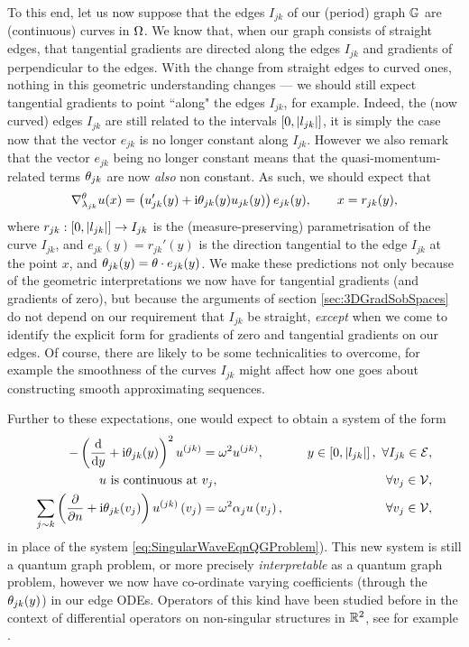 To this end, let us now suppose that the edges $I_{jk}$ of our (period) graph $\mathbb{G}$ are (continuous) curves in $\Omega$.
We know that, when our graph consists of straight edges, that tangential gradients are directed along the edges $I_{jk}$ and gradients of perpendicular to the edges.
With the change from straight edges to curved ones, nothing in this geometric understanding changes --- we should still expect tangential gradients to point ``along" the edges $I_{jk}$, for example.
Indeed, the (now curved) edges $I_{jk}$ are still related to the intervals $\left[ 0,\left\lvert l_{jk} \right\rvert \right]$, it is simply the case now that the vector $e_{jk}$ is no longer constant along $I_{jk}$.
However we also remark that the vector $e_{jk}$ being no longer constant means that the quasi-momentum-related terms $\theta_{jk}$ are now \emph{also} non constant.
As such, we should expect that
\begin{align*}
	\nabla^{\theta}_{\lambda_{jk}}u(x) = \left(  u_{jk}'(y) + \mathrm{i}\theta_{jk}(y) u_{jk}(y) \right)e_{jk}(y),
	\qquad x = r_{jk}(y),
\end{align*}
where $r_{jk}:\left[ 0,\left\lvert l_{jk} \right\rvert \right]\rightarrow I_{jk}$ is the (measure-preserving) parametrisation of the curve $I_{jk}$, and $e_{jk}(y) = r_{jk}'(y)$ is the direction tangential to the edge $I_{jk}$ at the point $x$, and $\theta_{jk}(y)=\theta\cdot e_{jk}(y)$.
We make these predictions not only because of the geometric interpretations we now have for tangential gradients (and gradients of zero), but because the arguments of section \ref{sec:3DGradSobSpaces} do not depend on our requirement that $I_{jk}$ be straight, \emph{except} when we come to identify the explicit form for gradients of zero and tangential gradients on our edges.
Of course, there are likely to be some technicalities to overcome, for example the smoothness of the curves $I_{jk}$ might affect how one goes about constructing smooth approximating sequences.

Further to these expectations, one would expect to obtain a system of the form
\begin{subequations}
	\begin{align*}
		-\left( \dfrac{\mathrm{d}}{\mathrm{d}y} + \mathrm{i}\theta_{jk}(y) \right)^2 u^{(jk)} &= \omega^2 u^{(jk)}, \quad &y\in\left[ 0,\left\lvert l_{jk} \right\rvert \right], \ \forall I_{jk}\in\mathcal{E}, \\
		u \text{ is continuous at } & v_j, \quad &\forall v_j\in\mathcal{V},  \\
		\sum_{j\sim k}\left( \dfrac{\partial }{\partial n} + \mathrm{i}\theta_{jk}(v_j) \right)u^{(jk)}\left( v_j \right) &= \omega^2\alpha_j u\left( v_j \right), \quad &\forall v_j\in\mathcal{V},
	\end{align*}
\end{subequations}
in place of the system \eqref{eq:SingularWaveEqnQGProblem}).
This new system is still a quantum graph problem, or more precisely \emph{interpretable} as a quantum graph problem, however we now have co-ordinate varying coefficients (through the $\theta_{jk}(y)$) in our edge ODEs.
Operators of this kind have been studied before in the context of differential operators on non-singular structures in $\mathbb{R}^2$, see for example \cite{shterenberg2007homogenization}. 
